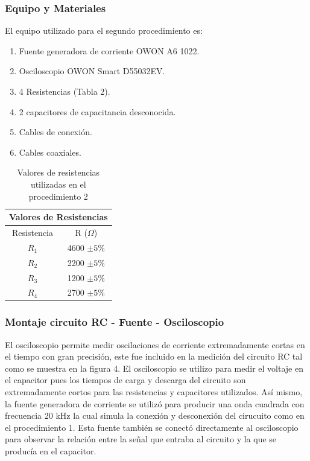 \documentclass[10pt,letter]{article}
\begin{document}
\begin{multicols}{2}
\subsubsection{Equipo y Materiales}
El equipo utilizado para el segundo procedimiento es:
\begin{enumerate}
\itemsep=0cm
\item Fuente generadora de corriente OWON A6 1022.
\item Osciloscopio OWON Smart D55032EV.
\item 4 Resistencias (Tabla 2).
\item 2 capacitores de capacitancia desconocida.
\item Cables de conexión.
\item Cables coaxiales.
\end{enumerate}
\begin{table}[H]
\centering
\begin{tabular}{|c|c|}
\hline
\multicolumn{2}{|l|}{Valores de Resistencias} \\ \hline
Resistencia & R ($\Omega$) \\ \hline
$R_1$ & 4600 $\pm 5\%$ \\ \hline
$R_2$ & 2200 $\pm 5\%$ \\ \hline
$R_3$ & 1200 $\pm 5\%$ \\ \hline
$R_4$ & 2700 $\pm 5\%$ \\ \hline
\end{tabular}
\caption{Valores de resistencias utilizadas en el procedimiento 2}
\end{table}
\subsubsection{Montaje circuito RC - Fuente - Osciloscopio}

El osciloscopio permite medir oscilaciones de corriente extremadamente cortas en el tiempo con gran precisión, este fue incluido en la medición del circuito RC tal como se muestra en la figura 4. El osciloscopio se utilizo para medir el voltaje en el capacitor pues los tiempos de carga y descarga del circuito son extremadamente cortos para las resistencias y capacitores utilizados. Así mismo, la fuente generadora de corriente se utilizó para producir una onda cuadrada con frecuencia 20 kHz la cual simula la conexión y desconexión del cirucuito como en el procedimiento 1. Esta fuente también se conectó directamente al osciloscopio para observar la relación entre la señal que entraba al circuito y la que se producía en el capacitor.


\end{multicols}
\end{document}
